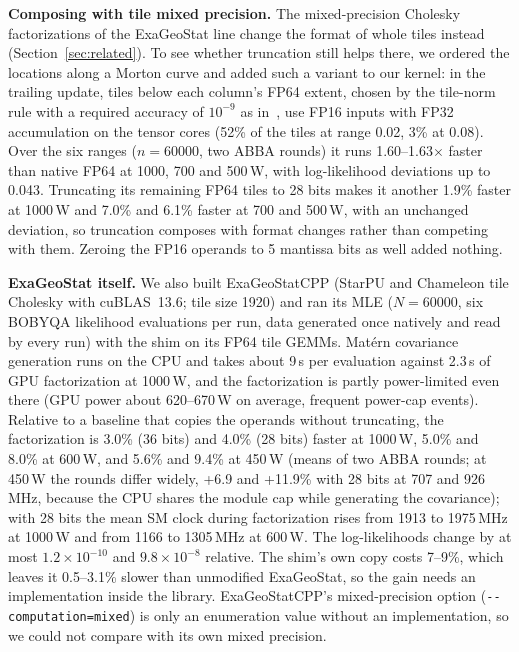 \documentclass[conference]{IEEEtran}
\newcommand{\W}{\,W}
\newcommand{\ee}[2]{#1{\times}10^{#2}}  %
\newcommand{\pct}{\%}
\begin{document}
\textbf{Composing with tile mixed precision.} The mixed-precision Cholesky factorizations of the ExaGeoStat line change
the format of whole tiles instead (Section~\ref{sec:related}). To see whether truncation still helps there, we ordered
the locations along a Morton curve and added such a variant to our kernel: in the trailing update, tiles below each
column's FP64 extent, chosen by the tile-norm rule with a required accuracy of $10^{-9}$ as in~\cite{Cao2023}, use FP16
inputs with FP32 accumulation on the tensor cores (52\pct{} of the tiles at range 0.02, 3\pct{} at 0.08). Over the six
ranges ($n=60000$, two ABBA rounds) it runs 1.60--1.63$\times$ faster than native FP64 at 1000, 700 and 500\W, with
log-likelihood deviations up to 0.043. Truncating its remaining FP64 tiles to 28 bits makes it another 1.9\pct{}
faster at 1000\W{} and 7.0\pct{} and 6.1\pct{} faster at 700 and 500\W, with an unchanged deviation, so truncation
composes with format changes rather than competing with them. Zeroing the FP16 operands to 5 mantissa bits as well
added nothing.

\textbf{ExaGeoStat itself.} We also built ExaGeoStatCPP (StarPU and Chameleon tile Cholesky with cuBLAS~13.6; tile
size 1920) and ran its MLE ($N=60000$, six BOBYQA likelihood evaluations per run, data generated once natively and
read by every run) with the shim on its FP64 tile GEMMs. Matérn covariance generation runs on the CPU and takes about
9\,s per evaluation against 2.3\,s of GPU factorization at 1000\W, and the factorization is partly power-limited even
there (GPU power about 620--670\W{} on average, frequent power-cap events). Relative to a baseline that copies the operands without
truncating, the factorization is 3.0\pct{} (36 bits) and 4.0\pct{} (28 bits) faster at 1000\W, 5.0\pct{} and
8.0\pct{} at 600\W, and 5.6\pct{} and 9.4\pct{} at 450\W{} (means of two ABBA rounds; at 450\W{} the rounds differ
widely, +6.9 and +11.9\pct{} with 28 bits at 707 and 926\,MHz, because the CPU shares the module cap while generating
the covariance); with 28 bits the mean SM clock during factorization rises from 1913 to 1975\,MHz at 1000\W{} and
from 1166 to 1305\,MHz at 600\W. The log-likelihoods change by at most $\ee{1.2}{-10}$ and $\ee{9.8}{-8}$ relative.
The shim's own copy costs 7--9\pct, which leaves it 0.5--3.1\pct{} slower than unmodified ExaGeoStat, so the gain
needs an implementation inside the library. ExaGeoStatCPP's mixed-precision option (\texttt{-{}-computation=mixed}) is
only an enumeration value without an implementation, so we could not compare with its own mixed precision.
\end{document}
